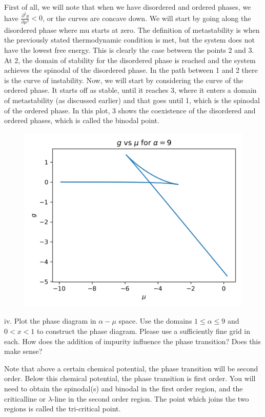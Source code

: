 \documentclass[12pt]{article}
\begin{document}
First of all, we will note that when we have disordered and ordered phases, we have $\frac{\partial ^2 g}{\partial \mu ^2} < 0$, or the curves are concave down. We will start by going along the disordered phase where mu starts at zero. The definition of metastability is when the previously stated thermodynamic condition is met, but the system does not have the lowest free energy. This is clearly the case between the points 2 and 3. At 2, the domain of stability for the disordered phase is reached and the system achieves the spinodal of the disordered phase. In the path between 1 and 2 there is the curve of instability. Now, we will start by considering the curve of the ordered phase. It starts off as stable, until it reaches 3, where it enters a domain of metastability (as discussed earlier) and that goes until 1, which is the spinodal of the ordered phase. In this plot, 3 shows the coexistence of the disordered and ordered phases, which is called the binodal point.
\begin{figure}
  \centering
  \includegraphics[max width=\textwidth]{g-mu-9.png}  
\end{figure}


iv. Plot the phase diagram in $\alpha-\mu$ space. Use the domains $1 \leq \alpha \leq 9$ and $0<x<1$ to construct the phase diagram. Please use a sufficiently fine grid in each. How does the addition of impurity influence the phase transition? Does this make sense?

Note that above a certain chemical potential, the phase transition will be second order. Below this chemical potential, the phase transition is first order. You will need to obtain the spinodal(s) and binodal in the first order region, and the criticalline or $\lambda$-line in the second order region. The point which joins the two regions is called the tri-critical point.
\end{document}
